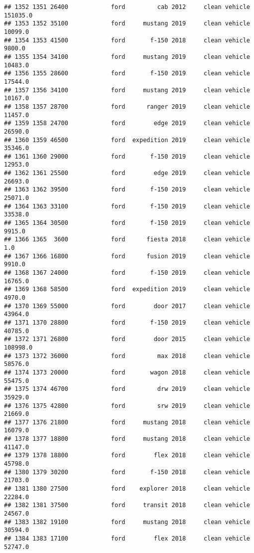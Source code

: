 \documentclass[
]{article}
\begin{document}
\begin{verbatim}
## 1352 1351 26400            ford         cab 2012     clean vehicle  151035.0
## 1353 1352 35100            ford     mustang 2019     clean vehicle   10099.0
## 1354 1353 41500            ford       f-150 2018     clean vehicle    9800.0
## 1355 1354 34100            ford     mustang 2019     clean vehicle   10483.0
## 1356 1355 28600            ford       f-150 2019     clean vehicle   17544.0
## 1357 1356 34100            ford     mustang 2019     clean vehicle   10167.0
## 1358 1357 28700            ford      ranger 2019     clean vehicle   11457.0
## 1359 1358 24700            ford        edge 2019     clean vehicle   26590.0
## 1360 1359 46500            ford  expedition 2019     clean vehicle   35346.0
## 1361 1360 29000            ford       f-150 2019     clean vehicle   12953.0
## 1362 1361 25500            ford        edge 2019     clean vehicle   26693.0
## 1363 1362 39500            ford       f-150 2019     clean vehicle   25071.0
## 1364 1363 33100            ford       f-150 2019     clean vehicle   33538.0
## 1365 1364 30500            ford       f-150 2019     clean vehicle    9915.0
## 1366 1365  3600            ford      fiesta 2018     clean vehicle       1.0
## 1367 1366 16800            ford      fusion 2019     clean vehicle    9910.0
## 1368 1367 24000            ford       f-150 2019     clean vehicle   16765.0
## 1369 1368 58500            ford  expedition 2019     clean vehicle    4970.0
## 1370 1369 55000            ford        door 2017     clean vehicle   43964.0
## 1371 1370 28800            ford       f-150 2019     clean vehicle   40785.0
## 1372 1371 26800            ford        door 2015     clean vehicle  108998.0
## 1373 1372 36000            ford         max 2018     clean vehicle   58576.0
## 1374 1373 20000            ford       wagon 2018     clean vehicle   55475.0
## 1375 1374 46700            ford         drw 2019     clean vehicle   35929.0
## 1376 1375 42800            ford         srw 2019     clean vehicle   21669.0
## 1377 1376 21800            ford     mustang 2018     clean vehicle   16079.0
## 1378 1377 18800            ford     mustang 2018     clean vehicle   41147.0
## 1379 1378 18800            ford        flex 2018     clean vehicle   45798.0
## 1380 1379 30200            ford       f-150 2018     clean vehicle   21703.0
## 1381 1380 27500            ford    explorer 2018     clean vehicle   22284.0
## 1382 1381 37500            ford     transit 2018     clean vehicle   24567.0
## 1383 1382 19100            ford     mustang 2018     clean vehicle   30594.0
## 1384 1383 17100            ford        flex 2018     clean vehicle   52747.0

\end{verbatim}
\end{document}
